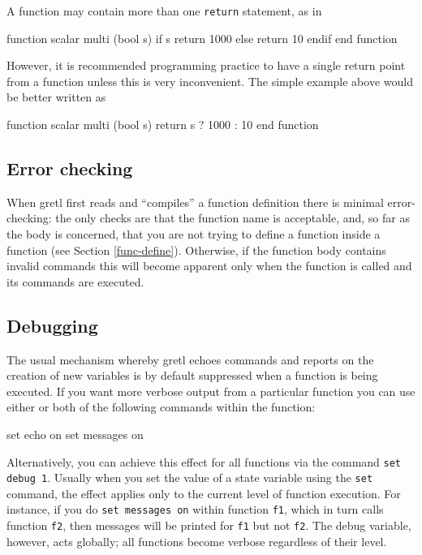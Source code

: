 A function may contain more than one \texttt{return} statement, as in
%
\begin{code}
function scalar multi (bool s)
   if s
      return 1000
   else
      return 10
   endif
end function
\end{code}
%
However, it is recommended programming practice to have a single
return point from a function unless this is very inconvenient.  The
simple example above would be better written as
%
\begin{code}
function scalar multi (bool s)
   return s ? 1000 : 10
end function
\end{code}
    

\subsection{Error checking}

When gretl first reads and ``compiles'' a function definition there is
minimal error-checking: the only checks are that the function name is
acceptable, and, so far as the body is concerned, that you are not
trying to define a function inside a function (see Section
\ref{func-define}). Otherwise, if the function body contains invalid
commands this will become apparent only when the function is called
and its commands are executed.

\subsection{Debugging}

The usual mechanism whereby gretl echoes commands and reports on
the creation of new variables is by default suppressed when a function
is being executed.  If you want more verbose output from a particular
function you can use either or both of the following commands within
the function:
%
\begin{code}
set echo on
set messages on
\end{code}

Alternatively, you can achieve this effect for all functions via
the command \texttt{set debug 1}.  Usually when you set the value of a
state variable using the \texttt{set} command, the effect applies only
to the current level of function execution.  For instance, if you do
\texttt{set messages on} within function \texttt{f1}, which in turn
calls function \texttt{f2}, then messages will be printed for
\texttt{f1} but not \texttt{f2}.  The debug variable, however, acts
globally; all functions become verbose regardless of their level.

